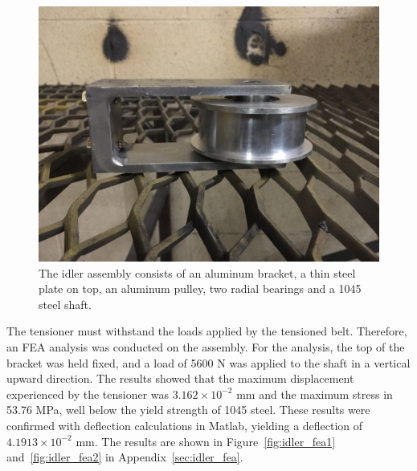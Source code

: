 \begin{figure}[htbp]
\centering
\includegraphics[height=0.3\textheight]{images/idler_assembly_bld}
\caption[Idler Assembly]{The idler assembly consists of an aluminum bracket, a thin steel plate on top, an aluminum pulley, two radial bearings and a 1045 steel shaft.}
\label{fig:idler}
\end{figure}

The tensioner must withstand the loads applied by the tensioned belt. Therefore, an FEA analysis was conducted on the assembly. For the analysis, the top of the bracket was held fixed, and a load of 5600 N was applied to the shaft in a vertical upward direction. The results showed that the maximum displacement experienced by the tensioner was ${3.162\times10^{-2}}$ mm and the maximum stress in 53.76 MPa, well below the yield strength of 1045 steel. These results were confirmed with deflection calculations in Matlab, yielding a deflection of ${4.1913\times10^{-2}}$ mm. The results are shown in Figure~\ref{fig:idler_fea1} and~\ref{fig:idler_fea2} in Appendix~\ref{sec:idler_fea}.



